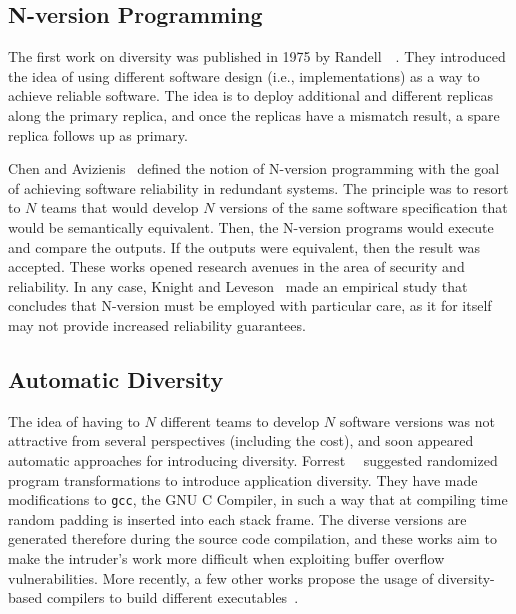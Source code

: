 \subsection{N-version Programming}
The first work on diversity was published in 1975 by Randell~\etal{}~\cite{Randell:1975}. 
They introduced the idea of using different software design (i.e., implementations) as a way to achieve reliable software. 
The idea is to deploy additional and different replicas along the primary replica, and once the replicas have a mismatch result, a spare replica follows up as primary.


Chen and Avizienis~\cite{Avizienis:1977,Chen:1978} defined the notion of N-version programming with the goal of achieving software reliability in redundant systems.
The principle was to resort to $N$ teams that would develop $N$ versions of the same software specification that would be semantically equivalent.
Then, the N-version programs would execute and compare the outputs.
If the outputs were equivalent, then the result was accepted.
These works opened research avenues in the area of security and reliability.
In any case, Knight and Leveson~\cite{Knight:1986} made an empirical study that concludes that N-version must be employed with particular care, as it for itself may not provide increased reliability guarantees. 

\subsection{Automatic Diversity}  
The idea of having to $N$ different teams to develop $N$ software versions was not attractive from several perspectives (including the cost), and soon appeared automatic approaches for introducing diversity.
Forrest~\etal{}~\cite{Forrest:1997} suggested randomized program transformations to introduce application diversity.
They have made modifications to \texttt{gcc}, the GNU C Compiler, in such a way that at compiling time random padding is inserted into each stack frame. 
The diverse versions are generated therefore during the source code compilation, and these works aim to make the intruder’s work more difficult when exploiting buffer overflow vulnerabilities.
More recently, a few other works propose the usage of diversity-based compilers to build different executables~\cite{Platania:2014,Roeder:2010,King:2016,Koo:2018}.


